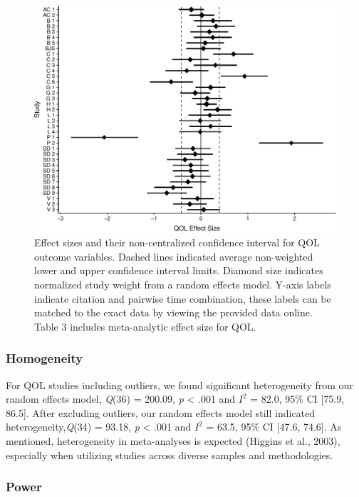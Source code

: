 \documentclass[,man]{apa6}
\begin{document}
\begin{figure}
\centering
\includegraphics{meta_markdown_files/figure-latex/qolpic-1.pdf}
\caption{\label{fig:qolpic}Effect sizes and their non-centralized confidence interval for QOL outcome variables. Dashed lines indicated average non-weighted lower and upper confidence interval limits. Diamond size indicates normalized study weight from a random effects model. Y-axis labels indicate citation and pairwise time combination, these labels can be matched to the exact data by viewing the provided data online. Table 3 includes meta-analytic effect size for QOL.}
\end{figure}

\hypertarget{homogeneity-2}{%
\subsubsection{Homogeneity}\label{homogeneity-2}}

For QOL studies including outliers, we found significant heterogeneity from our random effects model, \emph{Q}(36) = 200.09, \emph{p} \textless{} .001 and \(I^2\) = 82.0, 95\% CI {[}75.9, 86.5{]}. After excluding outliers, our random effects model still indicated heterogeneity,\emph{Q}(34) = 93.18, \emph{p} \textless{} .001 and \(I^2\) = 63.5, 95\% CI {[}47.6, 74.6{]}. As mentioned, heterogeneity in meta-analyses is expected (Higgins et al., 2003), especially when utilizing studies across diverse samples and methodologies.

\hypertarget{power-2}{%
\subsubsection{Power}\label{power-2}}
\end{document}
